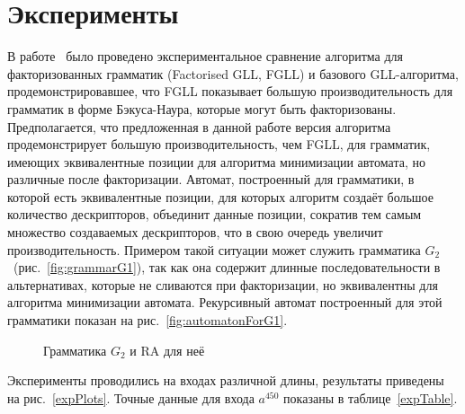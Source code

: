 \section{Эксперименты}
В работе~\cite{scott2016structuring}
было проведено экспериментальное сравнение алгоритма для факторизованных грамматик (Factorised GLL, FGLL) и базового GLL-алгоритма,
продемонстрировавшее, что FGLL показывает большую производительность для грамматик в форме Бэкуса-Наура, которые могут быть факторизованы.
Предполагается, что предложенная в данной работе версия алгоритма
продемонстрирует большую производительность, чем FGLL, для грамматик, имеющих эквивалентные позиции для алгоритма минимизации автомата,
но различные после факторизации. Автомат, построенный для грамматики, в которой есть эквивалентные позиции, для которых алгоритм создаёт большое количество дескрипторов,
объединит данные позиции, сократив тем самым множество создаваемых дескрипторов,
что в свою очередь увеличит производительность. Примером такой ситуации может служить грамматика 
$G_2$~(рис.~\ref{fig:grammarG1}), так как она содержит длинные последовательности 
в альтернативах, которые не сливаются при факторизации, но эквивалентны для алгоритма минимизации автомата.
Рекурсивный автомат построенный для этой грамматики показан на рис.~\ref{fig:automatonForG1}.

\begin{figure}[ht]   
	\centering
	
	\caption{Грамматика $G_2$ и RA для неё}
\end{figure}

Эксперименты проводились на входах различной длины, результаты приведены на рис.~\ref{expPlots}.
Точные данные для входа $a^{450}$ показаны в таблице~\ref{expTable}.

